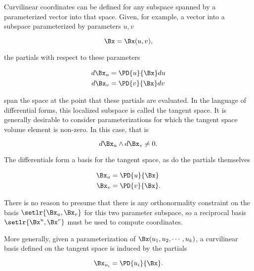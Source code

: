 Curvilinear coordinates can be defined for any subspace spanned by a parameterized vector into that space.  Given, for example, a vector into a subspace parameterized by parameters \(u,v\)

\begin{dmath}\label{eqn:curvilinear:20}
\Bx = \Bx(u, v),
\end{dmath}

the partials with respect to these parameters

\begin{dmath}\label{eqn:curvilinear:40}
\begin{aligned}
d\Bx_u &= \PD{u}{\Bx} du \\
d\Bx_v &= \PD{v}{\Bx} dv
\end{aligned}
\end{dmath}

span the space at the point that these partials are evaluated.  In the language of differential forms, this localized subspace is called the tangent space.  It is generally desirable to consider parameterizations for which the tangent space volume element is non-zero.  In this case, that is

\begin{dmath}\label{eqn:curvilinear:60}
d\Bx_u \wedge d\Bx_v \ne 0.
\end{dmath}

The differentials form a basis for the tangent space, as do the partials themselves

\begin{dmath}\label{eqn:curvilinear:80}
\begin{aligned}
\Bx_u &= \PD{u}{\Bx} \\
\Bx_v &= \PD{v}{\Bx}.
\end{aligned}
\end{dmath}

There is no reason to presume that there is any orthonormality constraint on the basis \( \setlr{ \Bx_u, \Bx_v } \) for this two parameter subspace, so a reciprocal basis \( \setlr{ \Bx^u, \Bx^v } \)
must be used to compute coordinates.

More generally, given a parameterization of \( \Bx(u_1, u_2, \cdots, u_k) \), a curvilinear basis defined on the tangent space is induced by the partials

\begin{dmath}\label{eqn:curvilinear:240}
\Bx_{u_i} = \PD{u_i}{\Bx}.
\end{dmath}

